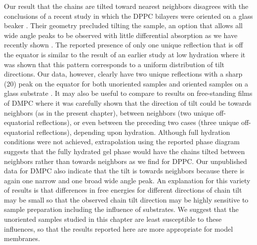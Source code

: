 Our result that the chains are tilted toward nearest neighbors disagrees
with the conclusions of a recent study in which the DPPC bilayers were 
oriented on a glass beaker \cite{Kat92}.
Their geometry precluded tilting the sample, an option
that allows all wide angle peaks to be observed with little differential
absorption as we have recently shown \cite{STN92}.
The reported presence \cite{Kat92} of only one unique reflection that
is off the equator is similar to the result of an earlier study
at low hydration \cite{Sta79} where it was shown that this pattern
corresponds to a uniform distribution of tilt directions.  
Our data, however, clearly have two unique reflections with a sharp
(20) peak on the equator for both unoriented samples and oriented samples
on a glass substrate \cite{STN92}.
It may also be useful to compare to results on free-standing
films of DMPC \cite{Smi88} where it was carefully shown that the 
direction of tilt could be towards neighbors (as in the present chapter),
between neighbors (two unique off-equatorial reflections),
or even between the preceding two cases (three unique off-equatorial 
reflections), depending upon hydration.  Although full hydration 
conditions were not achieved, extrapolation using the reported phase 
diagram \cite{Smi88} suggests that the fully hydrated gel phase would 
have the chains tilted between neighbors rather 
than towards neighbors as we find for DPPC.  Our unpublished data for DMPC
also indicate that the tilt is towards neighbors because there is again one
narrow and one broad wide angle peak.  An explanation for this variety 
of results is that differences in free energies for different directions 
of chain tilt may be small so that the observed chain tilt direction may 
be highly sensitive to sample preparation including the influence 
of substrates.  We suggest that the unoriented samples studied in this
chapter are least susceptible to these influences, so that the results 
reported here are more appropriate for model membranes.  
